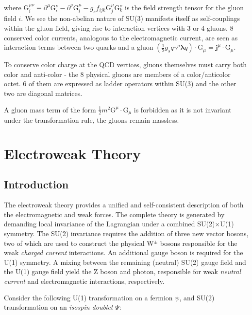 where $\mathrm{G}^{\mu\nu}_{i} \equiv \partial^{\mu} \mathrm{G}^{\nu}_{i} - \partial^{\nu} \mathrm{G}^{\mu}_{i} - g_{s} f_{ijk} \mathrm{G}^{\mu}_{j} \mathrm{G}^{\nu}_{k}$ is the field strength tensor for the gluon field $i$. We see the non-abelian nature of SU(3) manifests itself as self-couplings within the gluon field, giving rise to interaction vertices with 3 or 4 gluons. 8 conserved color currents, analogous to the electromagnetic current, are seen as interaction terms between two quarks and a gluon $(\frac{1}{2} g_{s} \bar{q} \gamma^{\mu} \bm{\lambda} q) \cdot \bm{\mathrm{G}}_{\mu} = \bm{j}^{\mu} \cdot \bm{\mathrm{G}}_{\mu}$.

To conserve color charge at the QCD vertices, gluons themselves must carry both color and anti-color - the 8 physical gluons are members of a color/anticolor octet. 6 of them are expressed as ladder operators within SU(3) and the other two are diagonal matrices.

A gluon mass term of the form $\frac{1}{2}m^{2}\bm{\mathrm{G}}^{\mu} \cdot \bm{\mathrm{G}}_{\mu}$ is forbidden as it is not invariant under the transformation rule, the gluons remain massless.

\section{Electroweak Theory}

\subsection{Introduction}

The electroweak theory provides a unified and self-consistent description of both the electromagnetic and weak forces. The complete theory is generated by demanding local invariance of the Lagrangian under a combined SU(2)$\times$U(1) symmetry. The SU(2) invariance requires the addition of three new vector bosons, two of which are used to construct the physical W$^{\pm}$ bosons responsible for the weak \textit{charged current} interactions. An additional gauge boson is required for the U(1) symmetry. A mixing between the remaining (neutral) SU(2) gauge field and the U(1) gauge field yield the Z boson and photon, responsible for weak \textit{neutral current} and electromagnetic interactions, respectively. 

Consider the following U(1) transformation on a fermion $\psi$, and SU(2) transformation on an \textit{isospin doublet} $\Psi$:

